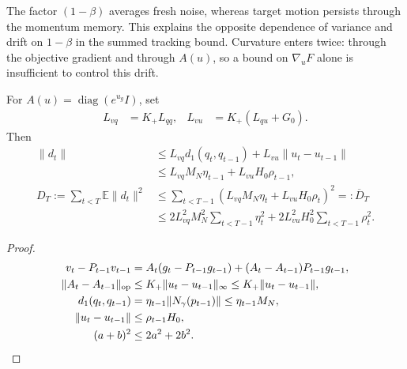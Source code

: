 The factor $(1-\beta)$ averages fresh noise, whereas target motion persists through the momentum memory. This explains the opposite dependence of variance and drift on $1-\beta$ in the summed tracking bound. Curvature enters twice: through the objective gradient and through $A(u)$, so a bound on $\nabla_uF$ alone is insufficient to control this drift.

\begin{lemma}
\label{lem:rigid-drift}
For $A(u)=\operatorname{diag}(e^{u_g}I)$, set
\begin{align}
 L_{vq}&=K_+L_{qq},&L_{vu}&=K_+(L_{qu}+G_0).
\end{align}
Then
\begin{align}
 \|d_t\|
 &\le L_{vq}d_1(q_t,q_{t-1})+L_{vu}\|u_t-u_{t-1}\|\\
 &\le L_{vq}M_N\eta_{t-1}+L_{vu}H_0\rho_{t-1},\\
 D_T:=\sum_{t<T}\mathbb E\|d_t\|^2
 &\le\sum_{t<T-1}(L_{vq}M_N\eta_t+L_{vu}H_0\rho_t)^2=:\overline D_T\\
 &\le2L_{vq}^2M_N^2\sum_{t<T-1}\eta_t^2+
 2L_{vu}^2H_0^2\sum_{t<T-1}\rho_t^2.
\end{align}
\end{lemma}
\begin{proof}
\begin{align}
 v_t-P_{t-1}v_{t-1}
 &=A_t(g_t-P_{t-1}g_{t-1})+(A_t-A_{t-1})P_{t-1}g_{t-1},\\
 \|A_t-A_{t-1}\|_{\rm op}
 &\le K_+\|u_t-u_{t-1}\|_\infty\le K_+\|u_t-u_{t-1}\|,\\
 d_1(q_t,q_{t-1})&=\eta_{t-1}\|N_\gamma(p_{t-1})\|\le\eta_{t-1}M_N,\\
 \|u_t-u_{t-1}\|&\le\rho_{t-1}H_0,\\
 (a+b)^2&\le2a^2+2b^2.
\end{align}
\end{proof}

